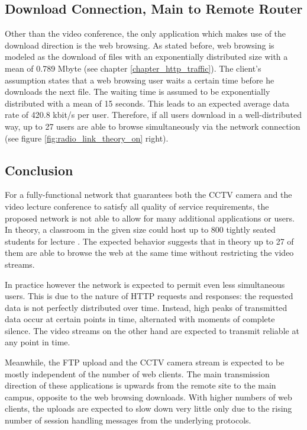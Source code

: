 \documentclass[a4paper,10pt]{book}\usepackage{graphicx}
\begin{document}
\subsection{Download Connection, Main to Remote Router}
Other than the video conference, the only application which makes use of the download direction is the web browsing. As stated before, web browsing is modeled as the download of files with an exponentially distributed size with a mean of 0.789 Mbyte (see chapter \ref{chapter_http_traffic}). The client's assumption states that a web browsing user waits a certain time before he downloads the next file. The waiting time is assumed to be exponentially distributed with a mean of 15 seconds. This leads to an expected average data rate of 420.8 kbit/s per user. Therefore, if all users download in a well-distributed way, up to 27 users are able to browse simultaneously via the network connection (see figure \ref{fig:radio_link_theory_on} right).

\subsection{Conclusion}
For a fully-functional network that guarantees both the CCTV camera and the video lecture conference to satisfy all quality of service requirements, the proposed network is not able to allow for many additional applications or users. In theory, a classroom in the given size could host up to 800 tightly seated students for lecture \cite{sitzkultur}. The expected behavior suggests that in theory up to 27 of them are able to browse the web at the same time without restricting the video streams. 

In practice however the network is expected to permit even less simultaneous users. This is due to the nature of HTTP requests and responses: the requested data is not perfectly distributed over time. Instead, high peaks of transmitted data occur at certain points in time, alternated with moments of complete silence. The video streams on the other hand are expected to transmit reliable at any point in time.

Meanwhile, the FTP upload and the CCTV camera stream is expected to be mostly independent of the number of web clients. The main transmission direction of these applications is upwards from the remote site to the main campus, opposite to the web browsing downloads. With higher numbers of web clients, the uploads are expected to slow down very little only due to the rising number of session handling messages from the underlying protocols.
\end{document}
